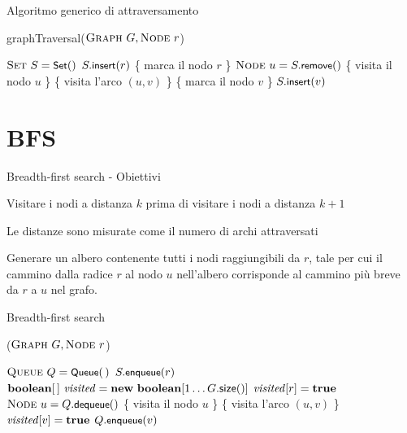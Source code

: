 \begin{frame}{Algoritmo generico di attraversamento}
	
\begin{Procedure}
\caption[A]{\textsf{graphTraversal}($\Graph\ G, \Node\ r$)}

$\textsc{Set}\ S = \textsf{{\small Set}}()$
$S.\textsf{{\small insert}}(r)$
\{ \alert{marca il nodo $r$} \} \;
{
  $\textsc{Node}\ u = S.\textsf{{\small remove}}()$
  \{ \alert{visita il nodo $u$} \}\;
  {
    \{ \alert{visita l'arco $(u,v)$} \}\;
    {
      \{ \alert{marca il nodo $v$} \} \;
      $S.\textsf{{\small insert}}(v)$
    }
  }
}
\end{Procedure}

\end{frame}

\section{BFS}

\begin{frame}{Breadth-first search - Obiettivi}

\BI
\item Visitare i nodi a distanza $k$ prima di visitare i nodi a distanza $k+1$ 
\EI

\medskip
{}
\BI
\item Le distanze sono misurate come il numero di archi attraversati
\EI

\medskip
{}
\BI
\item Generare un albero contenente tutti i nodi raggiungibili da $r$, tale per cui il cammino dalla radice $r$ al nodo $u$ nell'albero corrisponde al cammino più breve da $r$ a $u$ nel grafo.
\EI


\end{frame}

\begin{frame}[shrink=10]{Breadth-first search}

\vspace{-12pt}
\begin{Procedure}
\caption[A]{\bfsproc($\Graph\ G, \Node\ r$)}

$\textsc{Queue}\ Q = \textsf{{\small Queue}}(\,)$\;
$S.\textsf{{\small enqueue}}(r)$\;
$\BOOLEAN[\,]\ \mmark = \NEW\ \BOOLEAN[1 \mldots G.\textsf{size}()]$\;
$\mmark[r] = \TRUE$\;
{
  $\textsc{Node}\ u = Q.\textsf{{\small dequeue}}()$\;
  \{ \alert{visita il nodo $u$ }\}\;
  {
    \{ \alert{visita l'arco $(u,v)$} \}\;
    \If{\NOT $\mmark[v]$}
    {
      { $\mmark[v] = \TRUE$ } \;
      $Q.\textsf{{\small enqueue}}(v)$\;
    }
  }
}
\end{Procedure}

\end{frame}

